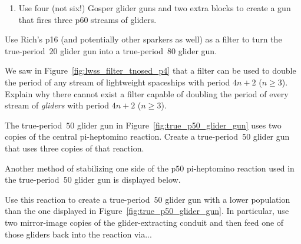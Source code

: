 \begin{multicols}{2}
\begin{problem}
\begin{enumerate}[label=\bf\color{ocre}(\alph*)]
			\item {} Use four (not six!) Gosper glider guns and two extra blocks to create a gun that fires three p$60$ streams of gliders.
		\end{enumerate}
	\end{problem}
	
	
	\mfilbreak
	
	
	\begin{problemstar}\label{exer:p80_gun_rich_p16} 
		Use Rich's p16 (and potentially other sparkers as well) as a filter to turn the true-period~$20$ glider gun into a true-period~$80$ glider gun.
		
	\end{problemstar}
	
	
	\mfilbreak
	
	
	\begin{problemstar}\label{exer:p4_glider_filter}
		We saw in Figure~\ref{fig:lwss_filter_tnosed_p4} that a filter can be used to double the period of any stream of lightweight spaceships with period $4n+2$ ($n \geq 3$). Explain why there cannot exist a filter capable of doubling the period of every stream of \emph{gliders} with period $4n+2$ ($n \geq 3$).
	\end{problemstar}
%
%	
%	
%	
	
	
	\mfilbreak
	
	
	\begin{problem}\label{exer:p50_triple_gun}
		The true-period~$50$ glider gun in Figure~\ref{fig:true_p50_glider_gun} uses two copies of the central pi-heptomino reaction. Create a true-period~$50$ glider gun that uses three copies of that reaction.
	\end{problem}
	
	
	\mfilbreak
	
	
	\begin{problemstar}\label{exer:p50_glider_stabilize}
		Another method of stabilizing one side of the p$50$ pi-heptomino reaction used in the true-period~$50$ glider gun is displayed below.
		\begin{center}
		\end{center}
		\noindent Use this reaction to create a true-period~$50$ glider gun with a lower population than the one displayed in Figure~\ref{fig:true_p50_glider_gun}. In particular, use two mirror-image copies of the glider-extracting conduit and then feed one of those gliders back into the reaction via...\smallskip
		

\end{problemstar}
\end{multicols}
